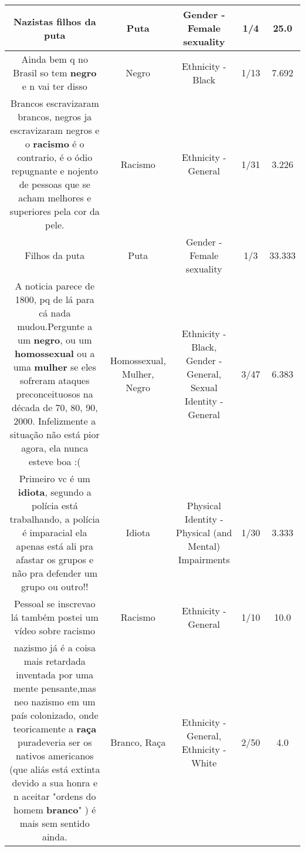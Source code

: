 \documentclass[11pt]{article}
\newlength\mylength
\begin{document}
\begin{center}
\begin{longtable}{|C{.65\mylength}|C{.30\mylength}|C{.12\mylength}|C{.12\mylength}|C{.12\mylength}|}
  \small Nazistas filhos da puta\normalsize   & Puta & Gender - Female sexuality & 1/4 & 25.0 \\  \hline
  \small Ainda bem q no Brasil so tem \textbf{negro} e n vai ter disso\normalsize   & Negro & Ethnicity - Black & 1/13 & 7.692 \\  \hline
  \small Brancos escravizaram brancos, negros ja escravizaram negros e o \textbf{racismo} é o contrario, é o ódio repugnante e nojento de pessoas que se acham melhores e superiores pela cor da pele.\normalsize   & Racismo & Ethnicity - General & 1/31 & 3.226 \\  \hline
  \small Filhos da puta\normalsize   & Puta & Gender - Female sexuality & 1/3 & 33.333 \\  \hline
  \small A noticia parece de 1800, pq de lá para cá nada mudou.Pergunte a um \textbf{negro}, ou um \textbf{homossexual} ou a uma \textbf{mulher} se eles sofreram ataques preconceituosos na década de 70, 80, 90, 2000. Infelizmente a situação não está pior agora, ela nunca esteve boa :(\normalsize   & Homossexual, Mulher, Negro & Ethnicity - Black, Gender - General, Sexual Identity - General & 3/47 & 6.383 \\  \hline
  \small Primeiro vc é um \textbf{idiota}, segundo a polícia está trabalhando, a polícia é imparacial ela apenas está ali pra afastar os grupos e não pra defender um grupo ou outro!!\normalsize   & Idiota & Physical Identity - Physical (and Mental) Impairments & 1/30 & 3.333 \\  \hline
  \small Pessoal se inscrevao lá também postei um vídeo sobre racismo\normalsize   & Racismo & Ethnicity - General & 1/10 & 10.0 \\  \hline
  \small nazismo já é a coisa mais retardada inventada por uma mente pensante,mas neo nazismo em um país colonizado, onde teoricamente a \textbf{raça} puradeveria ser os nativos americanos (que aliás está extinta devido a sua honra e n aceitar "ordens do homem \textbf{branco}" ) é mais sem sentido ainda.\normalsize   & Branco, Raça & Ethnicity - General, Ethnicity - White & 2/50 & 4.0 \\  \hline

\end{longtable}
\end{center}
\end{document}
